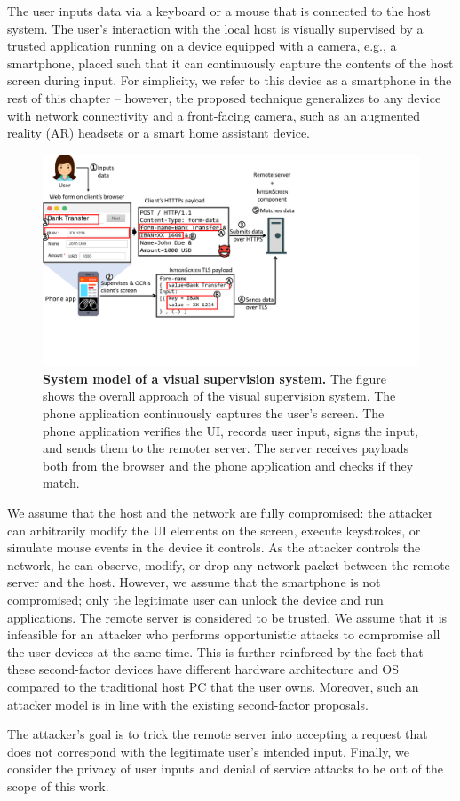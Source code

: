 The user inputs data via a keyboard or a mouse that is connected to the host system. The user's interaction with the local host is visually supervised by a trusted application running on a device equipped with a camera, e.g., a smartphone, placed such that it can continuously capture the contents of the host screen during input. 
For simplicity, we refer to this device as a smartphone in the rest of this chapter -- however, the proposed technique generalizes to any device with network connectivity and a front-facing camera, such as an augmented reality (AR) headsets or a smart home assistant device.

\begin{figure}[t]
	\centering
    \includegraphics[trim={0 3.7cm 11.2cm 0},clip,width=\linewidth]{chapters/IntegriScreen/newImg/overview-vertical.pdf}
	\caption[System model of a visual supervision system]{\textbf{System model of a visual supervision system.} The figure shows the overall approach of the visual supervision system. The phone application continuously captures the user's screen. The phone application verifies the UI, records user input, signs the input, and sends them to the remoter server. The server receives payloads both from the browser and the phone application and checks if they match.}
	\label{integriscreen:fig:systemModel}
\end{figure}


We assume that the host and the network are fully compromised: the attacker can arbitrarily modify the UI elements on the screen, execute keystrokes, or simulate mouse events in the device it controls. As the attacker controls the network, he can observe, modify, or drop any network packet between the remote server and the host.
However, we assume that the smartphone is not compromised; only the legitimate user can unlock the device and run applications. The remote server is considered to be trusted. 
We assume that it is infeasible for an attacker who performs opportunistic attacks to compromise all the user devices at the same time. This is further reinforced by the fact that these second-factor devices have different hardware architecture and OS compared to the traditional host PC that the user owns. Moreover, such an attacker model is in line with the existing second-factor proposals.

The attacker's goal is to trick the remote server into accepting a request that does not correspond with the legitimate user's intended input.
Finally, we consider the privacy of user inputs and denial of service attacks to be out of the scope of this work.